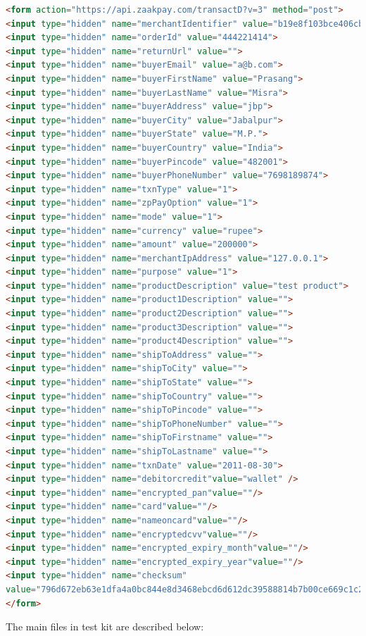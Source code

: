 \documentclass{article}
\begin{document}
\begin{lstlisting}[language=html,breaklines=true]
<form action="https://api.zaakpay.com/transactD?v=3" method="post">
<input type="hidden" name="merchantIdentifier" value="b19e8f103bce406cbd">
<input type="hidden" name="orderId" value="444221414">
<input type="hidden" name="returnUrl" value="">
<input type="hidden" name="buyerEmail" value="a@b.com">
<input type="hidden" name="buyerFirstName" value="Prasang">
<input type="hidden" name="buyerLastName" value="Misra">
<input type="hidden" name="buyerAddress" value="jbp">
<input type="hidden" name="buyerCity" value="Jabalpur">
<input type="hidden" name="buyerState" value="M.P.">
<input type="hidden" name="buyerCountry" value="India">
<input type="hidden" name="buyerPincode" value="482001">
<input type="hidden" name="buyerPhoneNumber" value="7698189874">
<input type="hidden" name="txnType" value="1">
<input type="hidden" name="zpPayOption" value="1">
<input type="hidden" name="mode" value="1">
<input type="hidden" name="currency" value="rupee">
<input type="hidden" name="amount" value="200000">
<input type="hidden" name="merchantIpAddress" value="127.0.0.1">
<input type="hidden" name="purpose" value="1">
<input type="hidden" name="productDescription" value="test product">
<input type="hidden" name="product1Description" value="">
<input type="hidden" name="product2Description" value="">
<input type="hidden" name="product3Description" value="">
<input type="hidden" name="product4Description" value="">
<input type="hidden" name="shipToAddress" value="">
<input type="hidden" name="shipToCity" value="">
<input type="hidden" name="shipToState" value="">
<input type="hidden" name="shipToCountry" value="">
<input type="hidden" name="shipToPincode" value="">
<input type="hidden" name="shipToPhoneNumber" value="">
<input type="hidden" name="shipToFirstname" value="">
<input type="hidden" name="shipToLastname" value="">
<input type="hidden" name="txnDate" value="2011-08-30">
<input type="hidden" name="debitorcredit"value="wallet" />
<input type="hidden" name="encrypted_pan"value=""/>
<input type="hidden" name="card"value=""/>
<input type="hidden" name="nameoncard"value=""/>
<input type="hidden" name="encryptedcvv"value=""/>
<input type="hidden" name="encrypted_expiry_month"value=""/>
<input type="hidden" name="encrypted_expiry_year"value=""/>
<input type="hidden" name="checksum"
value="796d672eb63e1dfa4a0bc844e8d3468ebcd6d612dc39588814b7b00ce669c1c2">
</form>
\end{lstlisting}
The main files in test kit are described below:
\end{document}
